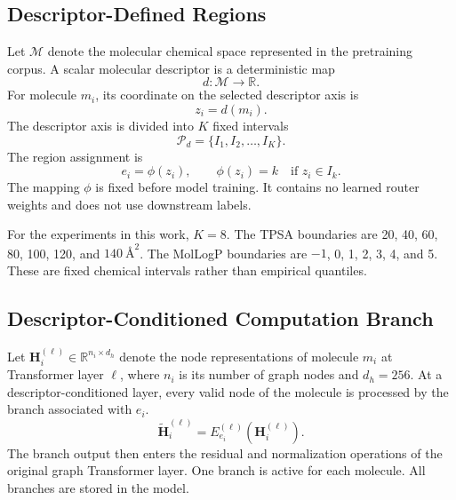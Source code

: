 \documentclass[journal=jcisd8,manuscript=article]{achemso}
\begin{document}
\subsection{Descriptor-Defined Regions}

Let \(\mathcal{M}\) denote the molecular chemical space represented in the
pretraining corpus. A scalar molecular descriptor is a deterministic map
\begin{equation}
d:\mathcal{M}\rightarrow\mathbb{R}.
\end{equation}
For molecule \(m_i\), its coordinate on the selected descriptor axis is
\begin{equation}
z_i=d(m_i).
\end{equation}
The descriptor axis is divided into \(K\) fixed intervals
\begin{equation}
\mathcal{P}_{d}=\{I_1,I_2,\ldots,I_K\}.
\end{equation}
The region assignment is
\begin{equation}
e_i=\phi(z_i), \qquad
\phi(z_i)=k \quad \text{if } z_i\in I_k.
\label{eq:descriptor-assignment}
\end{equation}
The mapping \(\phi\) is fixed before model training. It contains no learned
router weights and does not use downstream labels.

For the experiments in this work, \(K=8\). The TPSA boundaries are 20, 40,
60, 80, 100, 120, and \(140\ \text{\AA}^{2}\). The MolLogP boundaries are
\(-1\), 0, 1, 2, 3, 4, and 5. These are fixed chemical intervals rather than
empirical quantiles.

\subsection{Descriptor-Conditioned Computation Branch}

Let \(\mathbf{H}^{(\ell)}_i\in\mathbb{R}^{n_i\times d_h}\) denote the node
representations of molecule \(m_i\) at Transformer layer \(\ell\), where
\(n_i\) is its number of graph nodes and \(d_h=256\). At a
descriptor-conditioned layer, every valid node of the molecule is processed
by the branch associated with \(e_i\).
\begin{equation}
\widetilde{\mathbf{H}}^{(\ell)}_i
=E^{(\ell)}_{e_i}\left(\mathbf{H}^{(\ell)}_i\right).
\label{eq:conditional-branch}
\end{equation}
The branch output then enters the residual and normalization operations of
the original graph Transformer layer. One branch is active for each molecule.
All branches are stored in the model.
\end{document}
